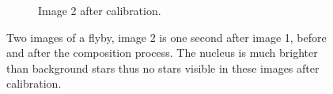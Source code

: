 \begin{figure}[htb]
\begin{subfigure}[b]{0.48\textwidth}
                \caption{Image 2 after calibration.}
                \label{fig:composition_after_2}
        \end{subfigure}
        \caption{Two images of a flyby, image 2 is one second after image 1, before and after the composition process. The nucleus is much brighter than background stars thus no stars visible in these images after calibration.}
        \label{fig:composition_before_after}
\end{figure}



